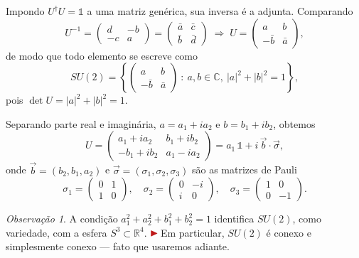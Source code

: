 \documentclass[12pt,a4paper]{article}
\newcommand{\marcador}{\ensuremath{\color{corDestaque}\blacktriangleright}\,}
\newcommand{\add}[1]{{\marcador\color{corDestaque}#1}}
\newcommand{\C}{\mathbb{C}}
\newcommand{\R}{\mathbb{R}}
\newcommand{\id}{\mathbb{1}}                 %
\newcommand{\dg}{\dagger}
\newcommand{\vsig}{\vec{\sigma}}
\theoremstyle{definition}
\theoremstyle{plain}
\theoremstyle{remark}
\newtheorem*{observacao}{Observação}
\begin{document}
Impondo $U^{\dg}U=\id$ a uma matriz genérica, sua inversa é a adjunta.
Comparando
\[
  U^{-1}=\begin{pmatrix} d & -b\\ -c & a\end{pmatrix}
  =\begin{pmatrix} \bar a & \bar c\\ \bar b & \bar d\end{pmatrix}
  \;\Longrightarrow\;
  U=\begin{pmatrix} a & b\\ -\bar b & \bar a\end{pmatrix},
\]
de modo que todo elemento se escreve como
\begin{equation}\label{eq:formaU}
  SU(2)=\left\{
    \begin{pmatrix} a & b\\ -\bar b & \bar a\end{pmatrix}
    \ :\ a,b\in\C,\ |a|^2+|b|^2=1
  \right\},
\end{equation}
pois $\det U=|a|^2+|b|^2=1$.

Separando parte real e imaginária, $a=a_1+ia_2$ e $b=b_1+ib_2$, obtemos
\begin{equation}\label{eq:Upauli}
  U=\begin{pmatrix} a_1+ia_2 & b_1+ib_2\\ -b_1+ib_2 & a_1-ia_2\end{pmatrix}
   = a_1\,\id + i\,\vec b\cdot\vsig ,
\end{equation}
onde $\vec b=(b_2,b_1,a_2)$ e $\vsig=(\sigma_1,\sigma_2,\sigma_3)$ são as
matrizes de Pauli
\[
  \sigma_1=\begin{pmatrix}0&1\\1&0\end{pmatrix},\quad
  \sigma_2=\begin{pmatrix}0&-i\\ i&0\end{pmatrix},\quad
  \sigma_3=\begin{pmatrix}1&0\\0&-1\end{pmatrix}.
\]

\begin{observacao}
A condição $a_1^2+a_2^2+b_1^2+b_2^2=1$ identifica $SU(2)$, como variedade,
com a esfera $S^3\subset\R^4$. \add{Em particular, $SU(2)$ é conexo e
simplesmente conexo — fato que usaremos adiante.}
\end{observacao}
\end{document}
